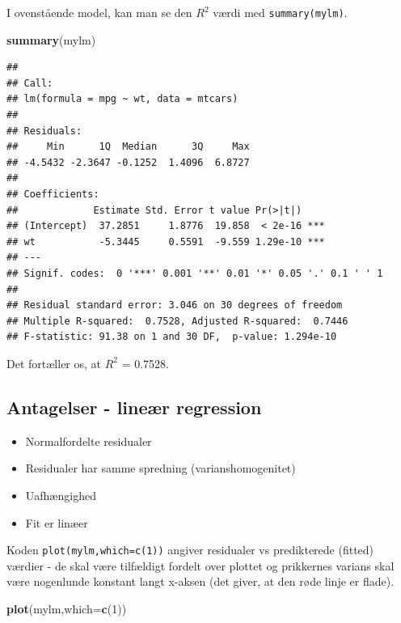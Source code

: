 \documentclass[
]{book}
\newenvironment{Shaded}{\begin{snugshade}}{\end{snugshade}}
\newcommand{\AttributeTok}[1]{\textcolor[rgb]{0.13,0.29,0.53}{#1}}
\newcommand{\DecValTok}[1]{\textcolor[rgb]{0.00,0.00,0.81}{#1}}
\newcommand{\FunctionTok}[1]{\textcolor[rgb]{0.13,0.29,0.53}{\textbf{#1}}}
\newcommand{\NormalTok}[1]{#1}
\providecommand{\tightlist}{%
  \setlength{\itemsep}{0pt}\setlength{\parskip}{0pt}}
\begin{document}
I ovenstående model, kan man se den \(R^2\) værdi med \texttt{summary(mylm)}.

\begin{Shaded}
\begin{Highlighting}[]
\FunctionTok{summary}\NormalTok{(mylm)}
\end{Highlighting}
\end{Shaded}

\begin{verbatim}
## 
## Call:
## lm(formula = mpg ~ wt, data = mtcars)
## 
## Residuals:
##     Min      1Q  Median      3Q     Max 
## -4.5432 -2.3647 -0.1252  1.4096  6.8727 
## 
## Coefficients:
##             Estimate Std. Error t value Pr(>|t|)    
## (Intercept)  37.2851     1.8776  19.858  < 2e-16 ***
## wt           -5.3445     0.5591  -9.559 1.29e-10 ***
## ---
## Signif. codes:  0 '***' 0.001 '**' 0.01 '*' 0.05 '.' 0.1 ' ' 1
## 
## Residual standard error: 3.046 on 30 degrees of freedom
## Multiple R-squared:  0.7528, Adjusted R-squared:  0.7446 
## F-statistic: 91.38 on 1 and 30 DF,  p-value: 1.294e-10
\end{verbatim}

Det fortæller os, at \(R^2\) = 0.7528.

\subsection{Antagelser - lineær regression}\label{antagelser---lineuxe6r-regression}

\begin{itemize}
\tightlist
\item
  Normalfordelte residualer
\item
  Residualer har samme spredning (varianshomogenitet)
\item
  Uafhængighed
\item
  Fit er linæer
\end{itemize}

Koden \texttt{plot(mylm,which=c(1))} angiver residualer vs predikterede (fitted) værdier - de skal være tilfældigt fordelt over plottet og prikkernes varians skal være nogenlunde konstant langt x-aksen (det giver, at den røde linje er flade).

\begin{Shaded}
\begin{Highlighting}[]
\FunctionTok{plot}\NormalTok{(mylm,}\AttributeTok{which=}\FunctionTok{c}\NormalTok{(}\DecValTok{1}\NormalTok{))}
\end{Highlighting}
\end{Shaded}
\end{document}
